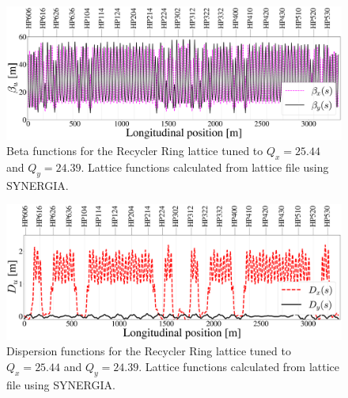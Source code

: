 \begin{figure}[H]
   \centering
   \includegraphics[width=\columnwidth]{chapter3/betas.png}
   \caption{Beta functions for the Recycler Ring lattice tuned to $Q_x=25.44$ and $Q_y=24.39$. Lattice functions calculated from lattice file using SYNERGIA.}
   \label{fig:rrbetas}
\end{figure}

\begin{figure}[H]
   \centering
   \includegraphics[width=\columnwidth]{chapter3/disps.png}
   \caption{Dispersion functions for the Recycler Ring lattice tuned to $Q_x=25.44$ and $Q_y=24.39$. Lattice functions calculated from lattice file using SYNERGIA.}
   \label{fig:rrdisps}
\end{figure}

